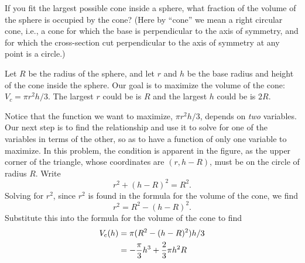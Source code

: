 \documentclass{ximera}
\begin{document}
\begin{example}
If you fit the largest possible cone inside a sphere, what fraction of the
volume of the sphere is occupied by the cone?  (Here by ``cone'' we mean a
right circular cone, i.e., a cone for which the base is perpendicular to
the axis of symmetry, and for which the cross-section cut perpendicular to
the axis of symmetry at any point is a circle.)
\begin{image}
\end{image}
\begin{explanation}
Let $R$ be the radius of the sphere, and let $r$ and $h$ be the base
radius and height of the cone inside the sphere.  Our goal is to
maximize the volume of the cone: $V_c=\pi r^2h/3$.  The largest $r$
could be is $R$ and the largest $h$ could be is $2R$.

Notice that the function we want to maximize, $\pi r^2h/3$, depends on
\textit{two} variables.  Our next step is to find the relationship and
use it to solve for one of the variables in terms of the other, so as
to have a function of only one variable to maximize.  In this problem,
the condition is apparent in the figure, as the upper corner of the
triangle, whose coordinates are $(r,h-R)$, must be on the circle of
radius $R$. Write
\[
r^2 + (h-R)^2=R^2.
\] 
Solving for $r^2$, since $r^2$ is found in the formula for the volume
of the cone, we find 
\[
r^2=R^2-(h-R)^2.
\]  
Substitute this into the formula for the volume of the cone to find
\begin{align*}
 V_{\text{c}}(h)&=\pi(R^2-(h-R)^2)h/3 \\
&=-{\pi\over3}h^3+{2\over3}\pi h^2R
\end{align*}


\end{explanation}
\end{example}
\end{document}
